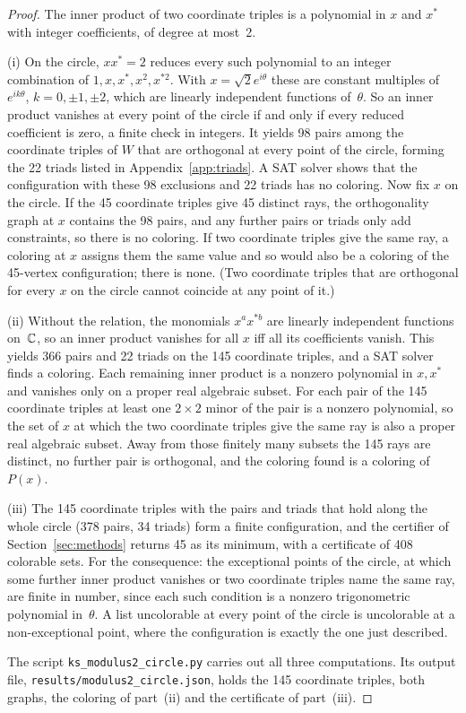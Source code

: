 \begin{proof}
The inner product of two coordinate triples is a polynomial in $x$ and $x^{*}$ with integer coefficients, of
degree at most~2.

(i)  On the circle, $xx^{*}=2$ reduces every such polynomial to an integer combination of
$1,x,x^{*},x^2,x^{*2}$.  With $x=\sqrt2e^{i\theta}$ these are constant multiples of
$e^{ik\theta}$, $k=0,\pm1,\pm2$, which are linearly independent functions of~$\theta$.  So an
inner product vanishes at every point of the circle if and only if every reduced coefficient is
zero, a finite check in integers.  It yields 98 pairs among the coordinate triples of $W$ that are orthogonal
at every point of the circle, forming the 22 triads listed in Appendix~\ref{app:triads}.  A SAT
solver shows that the configuration with these 98 exclusions and 22 triads has no coloring.  Now
fix $x$ on the circle.  If the 45 coordinate triples give 45 distinct rays, the orthogonality graph at $x$
contains the 98 pairs, and any further pairs or triads only add constraints, so there is no
coloring.  If two coordinate triples give the same ray, a coloring at $x$ assigns them the same value and so
would also be a coloring of the 45-vertex configuration; there is none.  (Two coordinate triples that are
orthogonal for every $x$ on the circle cannot coincide at any point of it.)

(ii)  Without the relation, the monomials $x^ax^{*b}$ are linearly independent functions
on~$\mathbb{C}$, so an inner product vanishes for all $x$ iff all its coefficients vanish.  This yields
366 pairs and 22 triads on the 145 coordinate triples, and a SAT solver finds a coloring.  Each remaining
inner product is a nonzero polynomial in $x,x^{*}$ and vanishes only on a proper real algebraic
subset.  For each pair of the 145 coordinate triples at least one $2\times2$ minor of the pair is a nonzero
polynomial, so the set of $x$ at which the two coordinate triples give the same ray is also a proper real
algebraic subset.  Away from those finitely many subsets the 145 rays are distinct, no further
pair is orthogonal, and the coloring found is a coloring of $P(x)$.

(iii)  The 145 coordinate triples with the pairs and triads that hold along the whole circle (378 pairs, 34
triads) form a finite configuration, and the certifier of Section~\ref{sec:methods} returns 45 as
its minimum, with a certificate of 408 colorable sets.  For the consequence: the exceptional
points of the circle, at which some further inner product vanishes or two coordinate triples name the same ray, are
finite in number, since each such condition is a nonzero trigonometric polynomial in~$\theta$.
A list uncolorable at every point of the circle is uncolorable at a non-exceptional point, where
the configuration is exactly the one just described.

The script \texttt{ks\_modulus2\_circle.py} carries out all three computations.  Its
output file, \texttt{results/modulus2\_circle.json}, holds the 145 coordinate triples, both graphs, the
coloring of part~(ii) and the certificate of part~(iii).
\end{proof}

